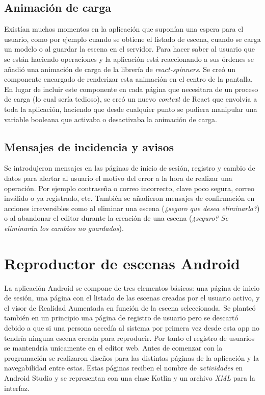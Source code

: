 \subsection{Animación de carga}

Existían muchos momentos en la aplicación que suponían una espera para el usuario, como por ejemplo cuando se obtiene el listado de escena, cuando se carga un modelo o al guardar la escena en el servidor. Para hacer saber al usuario que se están haciendo operaciones y la aplicación está reaccionando a sus órdenes se añadió una animación de carga de la librería de \textit{react-spinners}\cite{reactspinners}. Se creó un componente encargado de renderizar esta animación en el centro de la pantalla. En lugar de incluir este componente en cada página que necesitara de un proceso de carga (lo cual sería tedioso), se creó un nuevo \textit{context} de React que envolvía a toda la aplicación, haciendo que desde cualquier punto se pudiera manipular una variable booleana que activaba o desactivaba la animación de carga.

\subsection{Mensajes de incidencia y avisos}

Se introdujeron mensajes en las páginas de inicio de sesión, registro y cambio de datos para alertar al usuario el motivo del error a la hora de realizar una operación. Por ejemplo contraseña o correo incorrecto, clave poco segura, correo inválido o ya registrado, etc. También se añadieron mensajes de confirmación en acciones irreversibles como al eliminar una escena (\textit{¿seguro que desea eliminarla?}) o al abandonar el editor durante la creación de una escena (\textit{¿seguro? Se eliminarán los cambios no guardados}).

\section{Reproductor de escenas Android}

La aplicación Android se compone de tres elementos básicos: una página de inicio de sesión, una página con el listado de las escenas creadas por el usuario activo, y el visor de Realidad Aumentada en función de la escena seleccionada. Se planteó también en un principio una página de registro de usuario pero se descartó debido a que si una persona accedía al sistema por primera vez desde esta app no tendría ninguna escena creada para reproducir. Por tanto el registro de usuarios se mantendría unicamente en el editor web. Antes de comenzar con la programación se realizaron diseños para las distintas páginas de la aplicación y la navegabilidad entre estas. Estas páginas reciben el nombre de \textit{actividades} en Android Studio y se representan con una clase Kotlin y un archivo \textit{XML} para la interfaz.

